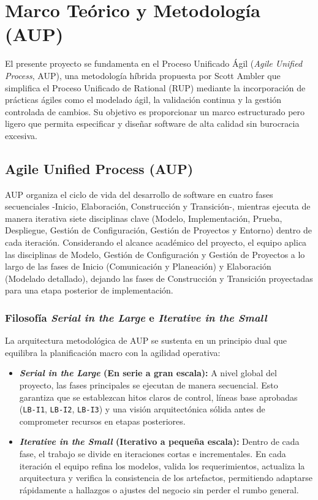 \section{Marco Teórico y Metodología (AUP)}

El presente proyecto se fundamenta en el Proceso Unificado Ágil (\textit{Agile Unified Process}, AUP), una metodología híbrida propuesta por Scott Ambler que simplifica el Proceso Unificado de Rational (RUP) mediante la incorporación de prácticas ágiles como el modelado ágil, la validación continua y la gestión controlada de cambios. Su objetivo es proporcionar un marco estructurado pero ligero que permita especificar y diseñar software de alta calidad sin burocracia excesiva.

\subsection{Agile Unified Process (AUP)}

AUP organiza el ciclo de vida del desarrollo de software en cuatro fases secuenciales -Inicio, Elaboración, Construcción y Transición-, mientras ejecuta de manera iterativa siete disciplinas clave (Modelo, Implementación, Prueba, Despliegue, Gestión de Configuración, Gestión de Proyectos y Entorno) dentro de cada iteración. Considerando el alcance académico del proyecto, el equipo aplica las disciplinas de Modelo, Gestión de Configuración y Gestión de Proyectos a lo largo de las fases de Inicio (Comunicación y Planeación) y Elaboración (Modelado detallado), dejando las fases de Construcción y Transición proyectadas para una etapa posterior de implementación.

\subsubsection{Filosofía \textit{Serial in the Large} e \textit{Iterative in the Small}}

La arquitectura metodológica de AUP se sustenta en un principio dual que equilibra la planificación macro con la agilidad operativa:

\begin{itemize}
    \item \textbf{\textit{Serial in the Large} (En serie a gran escala):} A nivel global del proyecto, las fases principales se ejecutan de manera secuencial. Esto garantiza que se establezcan hitos claros de control, líneas base aprobadas (\texttt{LB-I1}, \texttt{LB-I2}, \texttt{LB-I3}) y una visión arquitectónica sólida antes de comprometer recursos en etapas posteriores.
    \item \textbf{\textit{Iterative in the Small} (Iterativo a pequeña escala):} Dentro de cada fase, el trabajo se divide en iteraciones cortas e incrementales. En cada iteración el equipo refina los modelos, valida los requerimientos, actualiza la arquitectura y verifica la consistencia de los artefactos, permitiendo adaptarse rápidamente a hallazgos o ajustes del negocio sin perder el rumbo general.
\end{itemize}

